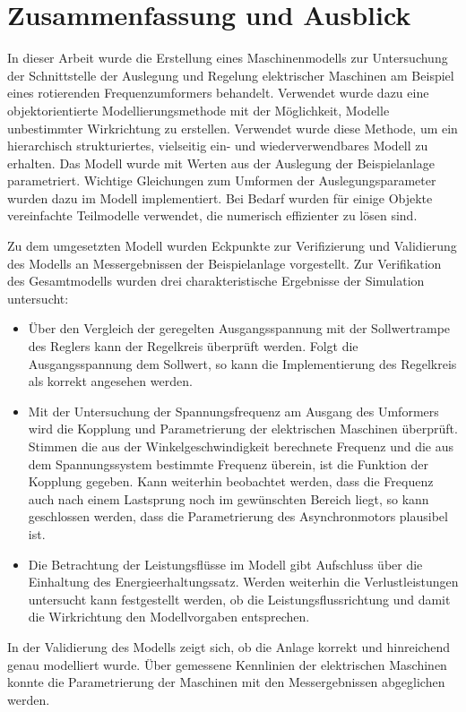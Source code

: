 \chapter{Zusammenfassung und Ausblick}
\label{chap:ZusammenfassungAusblick}
In dieser Arbeit wurde die Erstellung eines Maschinenmodells zur Untersuchung der Schnittstelle der Auslegung und Regelung elektrischer Maschinen am Beispiel eines rotierenden Frequenzumformers behandelt. Verwendet wurde dazu eine objektorientierte Modellierungsmethode mit der Möglichkeit, Modelle unbestimmter Wirkrichtung zu erstellen. Verwendet wurde diese Methode, um ein hierarchisch strukturiertes, vielseitig ein- und wiederverwendbares Modell zu erhalten. Das Modell wurde mit Werten aus der Auslegung der Beispielanlage parametriert. Wichtige Gleichungen zum Umformen der Auslegungsparameter wurden dazu im Modell implementiert. Bei Bedarf wurden für einige Objekte vereinfachte Teilmodelle verwendet, die numerisch effizienter zu lösen sind.

Zu dem umgesetzten Modell wurden Eckpunkte zur Verifizierung und Validierung des Modells an Messergebnissen der Beispielanlage vorgestellt. Zur Verifikation des Gesamtmodells wurden drei charakteristische Ergebnisse der Simulation untersucht:
\begin{itemize}
	\item Über den Vergleich der geregelten Ausgangsspannung mit der Sollwertrampe des Reglers kann der Regelkreis überprüft werden. Folgt die Ausgangsspannung dem Sollwert, so kann die Implementierung des Regelkreis als korrekt angesehen werden.
	\item Mit der Untersuchung der Spannungsfrequenz am Ausgang des Umformers wird die Kopplung und Parametrierung der elektrischen Maschinen überprüft. Stimmen die aus der Winkelgeschwindigkeit berechnete Frequenz und die aus dem Spannungssystem bestimmte Frequenz überein, ist die Funktion der Kopplung gegeben. Kann weiterhin beobachtet werden, dass die Frequenz auch nach einem Lastsprung noch im gewünschten Bereich liegt, so kann geschlossen werden, dass die Parametrierung des Asynchronmotors plausibel ist.
	\item Die Betrachtung der Leistungsflüsse im Modell gibt Aufschluss über die Einhaltung des Energieerhaltungssatz. Werden weiterhin die Verlustleistungen untersucht kann festgestellt werden, ob die Leistungsflussrichtung und damit die Wirkrichtung den Modellvorgaben entsprechen.
\end{itemize}
In der Validierung des Modells zeigt sich, ob die Anlage korrekt und hinreichend genau modelliert wurde. Über gemessene Kennlinien der elektrischen Maschinen konnte die Parametrierung der Maschinen mit den Messergebnissen abgeglichen werden.

